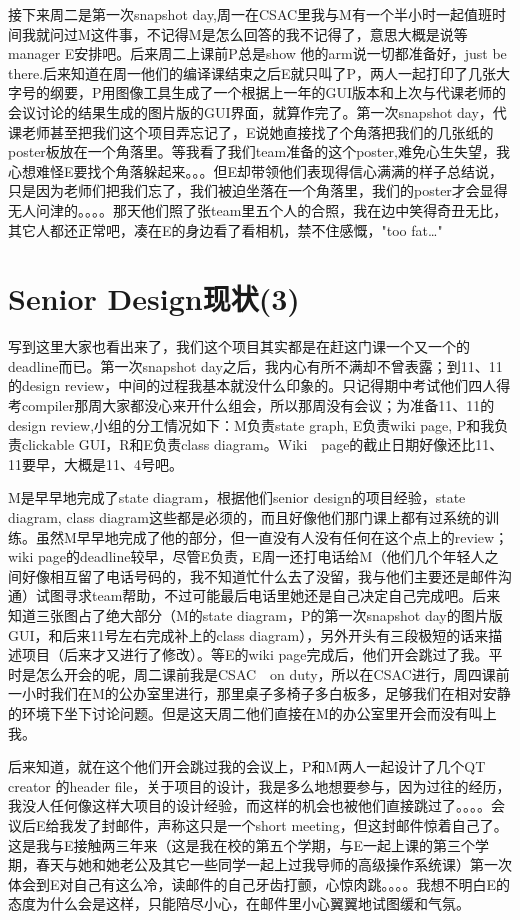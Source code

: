 \documentclass[12pt]{book}
\begin{document}
接下来周二是第一次snapshot day,周一在CSAC里我与M有一个半小时一起值班时间我就问过M这件事，不记得M是怎么回答的我不记得了，意思大概是说等manager E安排吧。后来周二上课前P总是show 他的arm说一切都准备好，just be there.后来知道在周一他们的编译课结束之后E就只叫了P，两人一起打印了几张大字号的纲要，P用图像工具生成了一个根据上一年的GUI版本和上次与代课老师的会议讨论的结果生成的图片版的GUI界面，就算作完了。第一次snapshot day，代课老师甚至把我们这个项目弄忘记了，E说她直接找了个角落把我们的几张纸的poster板放在一个角落里。等我看了我们team准备的这个poster,难免心生失望，我心想难怪E要找个角落躲起来。。。但E却带领他们表现得信心满满的样子总结说，只是因为老师们把我们忘了，我们被迫坐落在一个角落里，我们的poster才会显得无人问津的。。。。那天他们照了张team里五个人的合照，我在边中笑得奇丑无比，其它人都还正常吧，凑在E的身边看了看相机，禁不住感慨，"too fat…"
\section{Senior Design现状(3)}
\label{sec-21-3}
写到这里大家也看出来了，我们这个项目其实都是在赶这门课一个又一个的deadline而已。第一次snapshot day之后，我内心有所不满却不曾表露；到11、11的design review，中间的过程我基本就没什么印象的。只记得期中考试他们四人得考compiler那周大家都没心来开什么组会，所以那周没有会议；为准备11、11的design review,小组的分工情况如下：M负责state graph, E负责wiki page, P和我负责clickable GUI，R和E负责class diagram。Wiki　page的截止日期好像还比11、11要早，大概是11、4号吧。

M是早早地完成了state diagram，根据他们senior design的项目经验，state diagram, class diagram这些都是必须的，而且好像他们那门课上都有过系统的训练。虽然M早早地完成了他的部分，但一直没有人没有任何在这个点上的review；wiki page的deadline较早，尽管E负责，E周一还打电话给M（他们几个年轻人之间好像相互留了电话号码的，我不知道忙什么去了没留，我与他们主要还是邮件沟通）试图寻求team帮助，不过可能最后电话里她还是自己决定自己完成吧。后来知道三张图占了绝大部分（M的state diagram，P的第一次snapshot day的图片版GUI，和后来11号左右完成补上的class diagram），另外开头有三段极短的话来描述项目（后来才又进行了修改）。等E的wiki page完成后，他们开会跳过了我。平时是怎么开会的呢，周二课前我是CSAC　on duty，所以在CSAC进行，周四课前一小时我们在M的公办室里进行，那里桌子多椅子多白板多，足够我们在相对安静的环境下坐下讨论问题。但是这天周二他们直接在M的办公室里开会而没有叫上我。

后来知道，就在这个他们开会跳过我的会议上，P和M两人一起设计了几个QT　creator 的header file，关于项目的设计，我是多么地想要参与，因为过往的经历，我没人任何像这样大项目的设计经验，而这样的机会也被他们直接跳过了。。。。会议后E给我发了封邮件，声称这只是一个short meeting，但这封邮件惊着自己了。这是我与E接触两三年来（这是我在校的第五个学期，与E一起上课的第三个学期，春天与她和她老公及其它一些同学一起上过我导师的高级操作系统课）第一次体会到E对自己有这么冷，读邮件的自己牙齿打颤，心惊肉跳。。。。我想不明白E的态度为什么会是这样，只能陪尽小心，在邮件里小心翼翼地试图缓和气氛。
\end{document}
